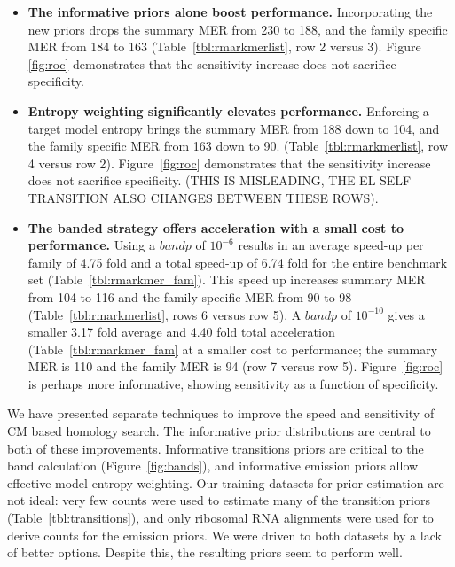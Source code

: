 \documentclass[11pt]{article}
\begin{document}
\begin{itemize}
\item
\textbf{The informative priors alone boost performance.}
Incorporating the new priors drops the summary MER from 230 to 188,
and the family specific MER from 184 to 163
(Table~\ref{tbl:rmarkmerlist}, row 2 versus 3). Figure \ref{fig:roc}
demonstrates that the sensitivity increase does not sacrifice specificity.

\item
\textbf{Entropy weighting significantly elevates performance.}
Enforcing a target model entropy brings the summary MER from 188 down to
104, and the family specific MER from 163 down to 90. 
(Table~\ref{tbl:rmarkmerlist}, row 4 versus row 2). Figure~\ref{fig:roc}
demonstrates that the sensitivity increase does not sacrifice
specificity.
 (THIS IS
MISLEADING, THE EL SELF TRANSITION ALSO CHANGES BETWEEN THESE ROWS).

\item
\textbf{The banded strategy offers acceleration with a small cost to
performance.} Using a $bandp$ of $10^{-6}$ results in an average
speed-up per family of 4.75 fold and a total speed-up of 6.74 fold for the
entire benchmark set (Table~\ref{tbl:rmarkmer_fam}).  This speed up
increases summary MER from 104 to 116 and
the family specific MER from 90 to 98 (Table~\ref{tbl:rmarkmerlist},
rows 6 versus row 5). A $bandp$ of $10^{-10}$ gives a smaller
3.17 fold average and 4.40 fold total acceleration
(Table~\ref{tbl:rmarkmer_fam} at a smaller cost to performance;
the summary MER is 110 and the family MER is 94 (row 7 versus row
5). Figure~\ref{fig:roc} is perhaps more informative, showing sensitivity
as a function of specificity.
\end{itemize}

We have presented separate techniques to improve the speed and 
sensitivity of CM based homology search. 
The informative prior distributions are central to both of these
improvements. Informative transitions priors are critical to
the band calculation (Figure~\ref{fig:bands}), and informative
emission priors allow effective model entropy weighting. Our training
datasets for prior estimation are not ideal: very few counts were used
to estimate many of the transition priors
(Table~\ref{tbl:transitions}), and only ribosomal RNA alignments were
used for to derive counts for the  emission priors. We were driven to
both datasets by a lack of better options. Despite this, the resulting
priors seem to perform well. 
\end{document}
